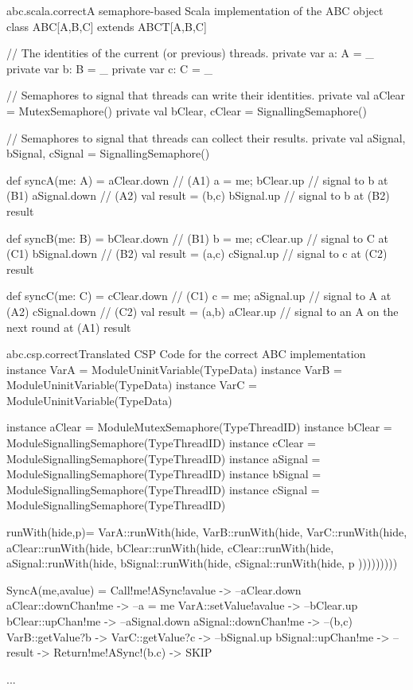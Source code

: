 \documentclass{article}
\begin{document}
\begin{scalafloat}{abc.scala.correct}{A semaphore-based Scala implementation of the ABC object}
class ABC[A,B,C] extends ABCT[A,B,C]{
  // The identities of the current (or previous) threads.
  private var a: A = _
  private var b: B = _
  private var c: C = _

  // Semaphores to signal that threads can write their identities.
  private val aClear = MutexSemaphore()
  private val bClear, cClear = SignallingSemaphore()

  // Semaphores to signal that threads can collect their results. 
  private val aSignal, bSignal, cSignal = SignallingSemaphore()

  def syncA(me: A) = {
    aClear.down         // (A1)
    a = me; bClear.up   // signal to b at (B1)
    aSignal.down        // (A2)
    val result = (b,c)
    bSignal.up          // signal to b at (B2)
    result
  }

  def syncB(me: B) = {
    bClear.down         // (B1)
    b = me; cClear.up   // signal to C at (C1)
    bSignal.down        // (B2)
    val result = (a,c)
    cSignal.up          // signal to c at (C2)
    result
  }

  def syncC(me: C) = {
    cClear.down         // (C1)
    c = me; aSignal.up  // signal to A at (A2)
    cSignal.down        // (C2)
    val result = (a,b)
    aClear.up           // signal to an A on the next round at (A1)
    result
  }
}      
\end{scalafloat}

\begin{cspfloat}{abc.csp.correct}{Translated CSP Code for the correct ABC implementation}
instance VarA = ModuleUninitVariable(TypeData) 
instance VarB = ModuleUninitVariable(TypeData)
instance VarC = ModuleUninitVariable(TypeData)

instance aClear = ModuleMutexSemaphore(TypeThreadID)
instance bClear = ModuleSignallingSemaphore(TypeThreadID)
instance cClear = ModuleSignallingSemaphore(TypeThreadID)
instance aSignal = ModuleSignallingSemaphore(TypeThreadID)
instance bSignal = ModuleSignallingSemaphore(TypeThreadID)
instance cSignal = ModuleSignallingSemaphore(TypeThreadID)

runWith(hide,p)=
  VarA::runWith(hide,
  VarB::runWith(hide,
  VarC::runWith(hide,
  aClear::runWith(hide,
  bClear::runWith(hide,
  cClear::runWith(hide,
  aSignal::runWith(hide,
  bSignal::runWith(hide,
  cSignal::runWith(hide,
    p
  )))))))))

SyncA(me,avalue) =
  Call!me!ASync!avalue ->
  --aClear.down
  aClear::downChan!me ->
  --a = me
  VarA::setValue!avalue ->
  --bClear.up
  bClear::upChan!me ->
  --aSignal.down
  aSignal::downChan!me ->
  --(b,c)
  VarB::getValue?b ->
  VarC::getValue?c ->
  --bSignal.up
  bSignal::upChan!me ->
  --result ->
  Return!me!ASync!(b.c) ->
  SKIP

...
\end{cspfloat}
\end{document}
